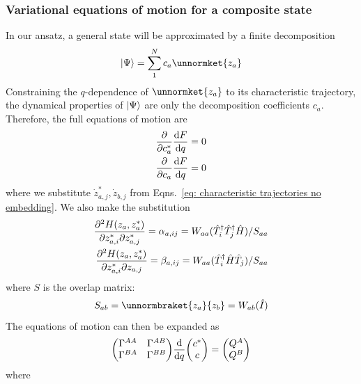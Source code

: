 \documentclass[12pt]{article}
\newcommand{\hc}{^\dagger}
\begin{document}
	
	\subsubsection{Variational equations of motion for a composite state}
	
	In our ansatz, a general state will be approximated by a finite decomposition
	\begin{equation}
	\ket{\Psi} = \sum_1^N c_a \unnormket{z_a}
	\end{equation}
	Constraining the $q$-dependence of $\unnormket{z_a}$ to its characteristic trajectory, the dynamical properties of $\ket{\Psi}$ are only the decomposition coefficients $c_a$. Therefore, the full equations of motion are
	\begin{align}
	\pdv{c_a^*} \dv{F}{q} &= 0\\
	\pdv{c_a} \dv{F}{q} &= 0
	\end{align}
	where we substitute $\dot{z}_{a,j}^*, \dot{z}_{b,j}$ from Eqns.~\eqref{eq: characteristic trajectories no embedding}. We also make the substitution
	\begin{align}
	\pdv[2]{H(z_a, z_a^*)}{z_{a,i}^*}{z_{a,j}^*} = \alpha_{a,ij} = W_{aa}(\hat{T}_i\hc \hat{T}_j\hc \hat{H}) / S_{aa}\\
	\pdv[2]{H(z_a, z_a^*)}{z_{a,i}^*}{z_{a,j}} = \beta_{a,ij} = W_{aa}(\hat{T}_i\hc \hat{H} \hat{T}_j) / S_{aa}
	\end{align}
	where $S$ is the overlap matrix:
	\begin{equation}
	S_{ab} = \unnormbraket{z_a}{z_b} = W_{ab}(\hat{I})
	\end{equation}
	The equations of motion can then be expanded as
	\begin{align}
	\mqty(\Gamma^{AA} & \Gamma^{AB} \\ \Gamma^{BA} & \Gamma^{BB}) \dv{q}\mqty(c^* \\ c) = \mqty(Q^A \\ Q^B)
	\end{align}
	where
\end{document}
